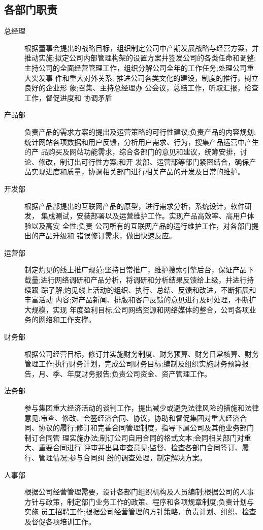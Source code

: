 \documentclass[master]{hduthesis}
\begin{document}
\subsection{各部门职责}
\begin{description}
	\item[总经理]根据董事会提出的战略目标，组织制定公司中产期发展战略与经营方案，并 推动实施;拟定公司内部管理构架的设置方案并签发公司的各类任命和调整;主持公司的全面经营管理工作，组织分解公司全年的工作任务;处理公司重大突发事 件和重大对外关系; 推进公司各类文化的建设，制度的推行，树立良好的企业形 象;召集、主持总经理办 公会议，总结工作，听取汇报，检查工作，督促进度和 协调矛盾
	\item[产品部]负责产品的需求方案的提出及运营策略的可行性建议;负责产品的内容规划; 统计网站各项数据和用户反馈，分析用户需求、行为，搜集产品运营中产生的产 品购买及网站功能需求，综合各部门的意见和建议，统筹安排，讨论、修改，制订出可行性方案;和开 发部、运营部等部门紧密结合，确保产品实现进度和质量，协调相关部门进行相关产品的开发及日常的维护。
	\item[开发部]根据产品部提出的互联网产品的原型，进行需求分析，系统设计，软件研发， 集成测试，安装部署以及运营维护工作。实现产品高效率、高用户体验以及高安 全性;负责 公司所有的互联网产品的运行维护工作，对各部门提出的产品升级和 错误修订需求，做出快速反应。
	\item[运营部]制定灼见的线上推广规范;坚持日常推广，维护搜索引擎后台，保证产品下 载量;进行网络调研和产品分析，将调研和分析结果反馈给上级，并进行持续跟 踪了解;灼见线上活动的组织、执行、总结、反馈和改进，不断拓展和丰富活动 内容;对产品新闻、排版和客户反馈的意见进行及时处理，不断扩大规模，实现 年度盈利目标;公司网络资源和网络媒体的整合，公司各项业务的网络和工作支撑。
	\item[财务部]根据公司经营目标，修订并实施财务制度、财务预算、财务日常核算、财务管理工作;执行财务计划，完成公司财务目标;编制及组织实施财务预算报告，月、季、年度财务报告;负责公司资金、资产管理工作。
	\item[法务部]参与集团重大经济活动的谈判工作，提出减少或避免法律风险的措施和法律 意见;审查、修改、会签经济合同、协议，协助和督促集团对重大经济合同、协议的履行;修订和完善合同管理制度，指导下属公司及其他业务部门制订合同管 理实施办法;制订公司自用合同的格式文本;会同相关部门对重大、重要合同进行 评审并出具审查意见;监督、检查各部门合同签订、履行、管理情况;参与合同纠 纷的调查处理，制定解决方案。
	\item[人事部]根据公司经营管理需要，设计各部门组织机构及人员编制;根据公司的人事方针与政策，制定部门业务工作的政策、程序和各项规章制度;负责计划与实施 员工招聘工作;根据公司经营管理的方针策略，负责计划、组织、检查及督促各项培训工作。
\end{description}
\end{document}
